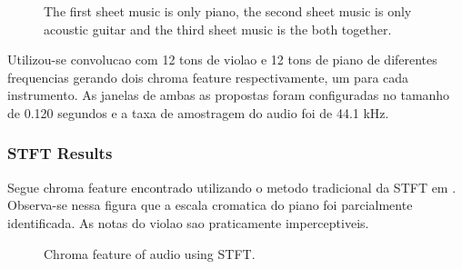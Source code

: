 \documentclass{article}
\begin{document}
	\begin{figure}[h]
	 \centerline{}
	 \centerline{}
	 \centerline{}
	 \caption{The first sheet music is only piano, the second sheet music is only acoustic guitar and the third sheet music is the both together.}
	 \label{fig:2-melodias}
	\end{figure}

Utilizou-se convolucao com 12 tons de violao e 12 tons de piano de diferentes frequencias gerando dois chroma feature respectivamente, um para cada instrumento. As janelas de ambas as propostas foram configuradas no tamanho de 0.120 segundos e a taxa de amostragem do audio foi de 44.1 kHz.

	\subsubsection{STFT Results}
	Segue chroma feature encontrado utilizando o metodo tradicional da STFT em . Observa-se nessa figura que a escala cromatica do piano foi parcialmente identificada. As notas do violao sao praticamente imperceptiveis.
	\newpage
	
	\begin{figure}[h]
	 \centerline{}
	 \caption{Chroma feature of audio using STFT.}
	 \label{fig:2-ssft}
	\end{figure}	
\end{document}
